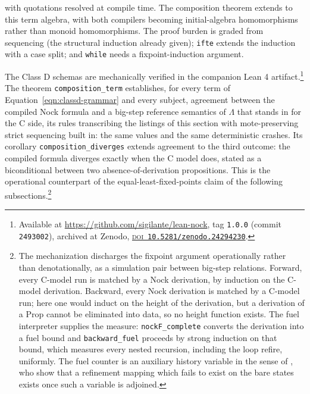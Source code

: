 \documentclass[twoside]{article}
\begin{document}
\noindent
with quotations resolved at compile time.  The composition theorem extends to this term algebra, with both compilers becoming initial-algebra homomorphisms rather than monoid homomorphisms.  The proof burden is graded from sequencing (the structural induction already given); \lstinline[style=inlinecode]{ifte} extends the induction with a case split; and \lstinline[style=inlinecode]{while} needs a fixpoint-induction argument.

The Class D schemas are mechanically verified in the companion Lean 4 artifact.\footnote{Available at \url{https://github.com/sigilante/lean-nock}, tag \texttt{1.0.0} (commit \texttt{2493002}), archived at Zenodo, \href{https://doi.org/10.5281/zenodo.24294230}{\textsc{doi}~\texttt{10.5281/zenodo.24294230}}.}  The theorem \lstinline[style=inlinecode]{composition_term} establishes, for every term of Equation~\ref{eqn:classd-grammar} and every subject, agreement between the compiled Nock formula and a big-step reference semantics of $\Lambda$ that stands in for the C side, its rules transcribing the listings of this section with mote-preserving strict sequencing built in: the same values and the same deterministic crashes.  Its corollary \lstinline[style=inlinecode]{composition_diverges} extends agreement to the third outcome:  the compiled formula diverges exactly when the C model does, stated as a biconditional between two absence-of-derivation propositions.  This is the operational counterpart of the equal-least-fixed-points claim of the following subsections.\footnote{The mechanization discharges the fixpoint argument operationally rather than denotationally, as a simulation pair between big-step relations.  Forward, every C-model run is matched by a Nock derivation, by induction on the C-model derivation.  Backward, every Nock derivation is matched by a C-model run; here one would induct on the height of the derivation, but a derivation of a \textsf{Prop} cannot be eliminated into data, so no height function exists.  The fuel interpreter supplies the measure:  \lstinline[style=inlinecode]{nockF_complete} converts the derivation into a fuel bound and \lstinline[style=inlinecode]{backward_fuel} proceeds by strong induction on that bound, which measures every nested recursion, including the loop refire, uniformly.  The fuel counter is an auxiliary history variable in the sense of \citet{AbadiLamport1991}, who show that a refinement mapping which fails to exist on the bare states exists once such a variable is adjoined.}
\end{document}

